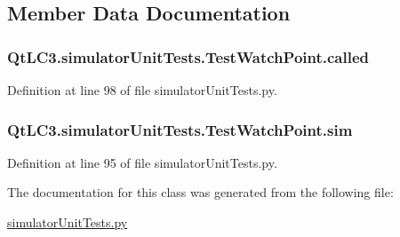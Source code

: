 \subsection{Member Data Documentation}
\hypertarget{class_qt_l_c3_1_1simulator_unit_tests_1_1_test_watch_point_a650cf940e4a573cf7a06561942e33f5f}{
\subsubsection[{called}]{\setlength{\rightskip}{0pt plus 5cm}Qt\-L\-C3.\-simulator\-Unit\-Tests.\-Test\-Watch\-Point.\-called}}\label{class_qt_l_c3_1_1simulator_unit_tests_1_1_test_watch_point_a650cf940e4a573cf7a06561942e33f5f}


Definition at line 98 of file simulator\-Unit\-Tests.\-py.

\hypertarget{class_qt_l_c3_1_1simulator_unit_tests_1_1_test_watch_point_ae94aeccff41200c0de16ec2002cc2a18}{
\subsubsection[{sim}]{\setlength{\rightskip}{0pt plus 5cm}Qt\-L\-C3.\-simulator\-Unit\-Tests.\-Test\-Watch\-Point.\-sim}}\label{class_qt_l_c3_1_1simulator_unit_tests_1_1_test_watch_point_ae94aeccff41200c0de16ec2002cc2a18}


Definition at line 95 of file simulator\-Unit\-Tests.\-py.



The documentation for this class was generated from the following file\-:\begin{DoxyCompactItemize}
\item 
\hyperlink{simulator_unit_tests_8py}{simulator\-Unit\-Tests.\-py}\end{DoxyCompactItemize}

